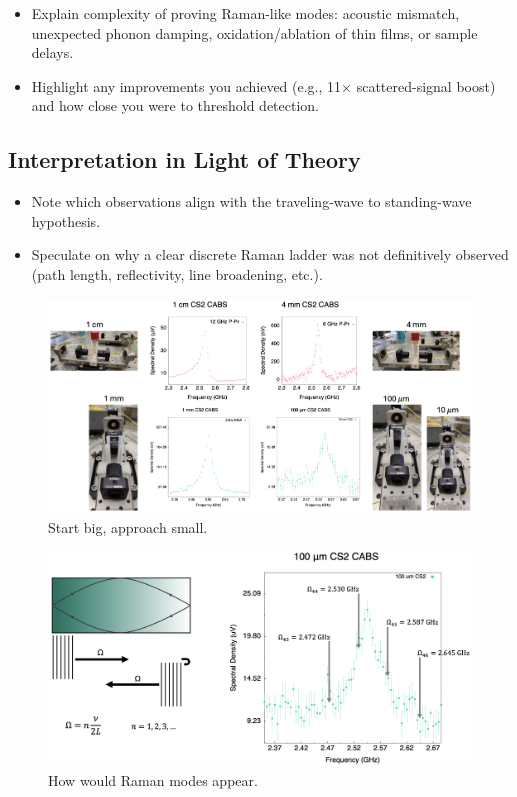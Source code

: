 \begin{itemize}
  \item Explain complexity of proving Raman-like modes: acoustic mismatch, unexpected phonon damping, oxidation/ablation of thin films, or sample delays.
  \item Highlight any improvements you achieved (e.g., 11\(\times\) scattered-signal boost) and how close you were to threshold detection.
\end{itemize}

\subsection{Interpretation in Light of Theory}
\label{subsec:Raman:InterpretationinLightofTheory}

\begin{itemize}
  \item Note which observations align with the traveling-wave to standing-wave hypothesis.
  \item Speculate on why a clear discrete Raman ladder was not definitively observed (path length, reflectivity, line broadening, etc.).
\end{itemize}

\begin{figure}[t]
  \centering
  \includegraphics[width=\textwidth]{figs/4-Raman/StartBigApproachSmall.png}
  \caption{Start big, approach small.}
  \label{fig:StartBigApproachSmall}
\end{figure}

\begin{figure}[t]
  \centering
  \includegraphics[width=\textwidth]{figs/4-Raman/HowWouldRamanModesAppear.png}
  \caption{How would Raman modes appear.}
  \label{fig:HowWouldRamanModesAppear}
\end{figure}


